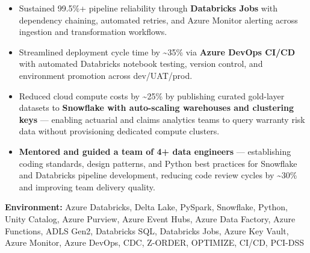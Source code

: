 \documentclass[a4paper,10pt]{article}
\begin{document}
\begin{itemize}
    \item Sustained 99.5\%+ pipeline reliability through \textbf{Databricks Jobs} with dependency chaining, automated retries, and Azure Monitor alerting across ingestion and transformation workflows.
    \item Streamlined deployment cycle time by \textasciitilde 35\% via \textbf{Azure DevOps CI/CD} with automated Databricks notebook testing, version control, and environment promotion across dev/UAT/prod.
    \item Reduced cloud compute costs by \textasciitilde 25\% by publishing curated gold-layer datasets to \textbf{Snowflake with auto-scaling warehouses and clustering keys} — enabling actuarial and claims analytics teams to query warranty risk data without provisioning dedicated compute clusters.
    \item \textbf{Mentored and guided a team of 4+ data engineers} — establishing coding standards, design patterns, and Python best practices for Snowflake and Databricks pipeline development, reducing code review cycles by \textasciitilde 30\% and improving team delivery quality.
\end{itemize}

\textbf{Environment:} Azure Databricks, Delta Lake, PySpark, Snowflake, Python, Unity Catalog, Azure Purview, Azure Event Hubs, Azure Data Factory, Azure Functions, ADLS Gen2, Databricks SQL, Databricks Jobs, Azure Key Vault, Azure Monitor, Azure DevOps, CDC, Z-ORDER, OPTIMIZE, CI/CD, PCI-DSS
\end{document}
